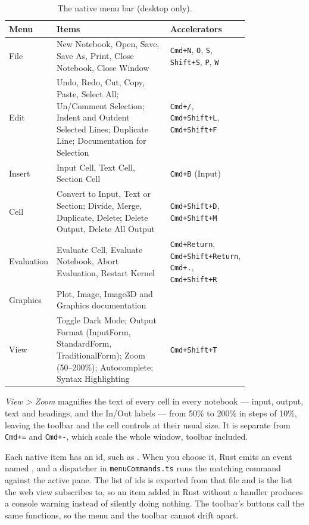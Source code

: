 \begin{table}[htbp]
\centering
\small
\begin{tabular}{@{}lp{0.5\linewidth}p{0.3\linewidth}@{}}
\toprule
\textbf{Menu} & \textbf{Items} & \textbf{Accelerators} \\
\midrule
File & New Notebook, Open, Save, Save As, Print, Close Notebook, Close Window
  & \texttt{Cmd+N}, \texttt{O}, \texttt{S}, \texttt{Shift+S}, \texttt{P}, \texttt{W} \\
Edit & Undo, Redo, Cut, Copy, Paste, Select All; Un/Comment Selection;
  Indent and Outdent Selected Lines; Duplicate Line; Documentation for Selection
  & \texttt{Cmd+/}, \texttt{Cmd+Shift+L}, \texttt{Cmd+Shift+F} \\
Insert & Input Cell, Text Cell, Section Cell & \texttt{Cmd+B} (Input) \\
Cell & Convert to Input, Text or Section; Divide, Merge, Duplicate, Delete;
  Delete Output, Delete All Output & \texttt{Cmd+Shift+D}, \texttt{Cmd+Shift+M} \\
Evaluation & Evaluate Cell, Evaluate Notebook, Abort Evaluation, Restart Kernel
  & \texttt{Cmd+Return}, \texttt{Cmd+Shift+Return}, \texttt{Cmd+.}, \texttt{Cmd+Shift+R} \\
Graphics & Plot, Image, Image3D and Graphics documentation & \\
View & Toggle Dark Mode; Output Format (InputForm, StandardForm,
  TraditionalForm); Zoom (50--200\%); Autocomplete; Syntax Highlighting
  & \texttt{Cmd+Shift+T} \\
\bottomrule
\end{tabular}
\caption{The native menu bar (desktop only).}
\label{tab:nb-menus}
\end{table}

\emph{View \textgreater{} Zoom} magnifies the text of every
cell in every notebook --- input, output, text and headings, and the In/Out
labels --- from 50\% to 200\% in steps of 10\%, leaving the toolbar and the
cell controls at their usual size. It is separate from \texttt{Cmd+=} and
\texttt{Cmd+-}, which scale the whole window, toolbar included.

Each native item has an id, such as . When you choose it,
Rust emits an event named , and a dispatcher in
\texttt{menuCommands.ts} runs the matching command against the active pane.
The list of ids is exported from that file and is the list the web view
subscribes to, so an item added in Rust without a handler produces a console
warning instead of silently doing nothing. The toolbar's buttons call the
same functions, so the menu and the toolbar cannot drift apart.

